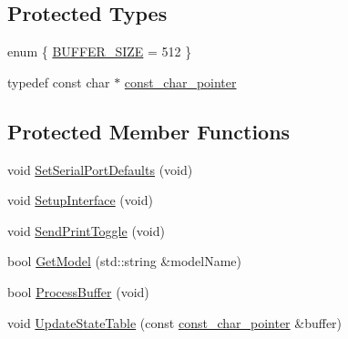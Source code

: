 \subsection*{Protected Types}
\begin{DoxyCompactItemize}
\item 
enum \{ \hyperlink{classmts_sartorius_serial_a3d845ebc5b0ea91a687044140a7b257aa7a2c0b5e39b999002353c52f30f82d1f}{B\-U\-F\-F\-E\-R\-\_\-\-S\-I\-Z\-E} = 512
 \}
\item 
typedef const char $\ast$ \hyperlink{classmts_sartorius_serial_a84eee50d0f43b06e6adac9ae20f4f02c}{const\-\_\-char\-\_\-pointer}
\end{DoxyCompactItemize}
\subsection*{Protected Member Functions}
\begin{DoxyCompactItemize}
\item 
void \hyperlink{classmts_sartorius_serial_a0acfac7c902913c73619a32f980b0825}{Set\-Serial\-Port\-Defaults} (void)
\item 
void \hyperlink{classmts_sartorius_serial_a9164bd6981785f181d85882d54c1a90b}{Setup\-Interface} (void)
\item 
void \hyperlink{classmts_sartorius_serial_ac2b2bb346c7a268c4520d08233eb514c}{Send\-Print\-Toggle} (void)
\item 
bool \hyperlink{classmts_sartorius_serial_a2538f5214752157e6753650f5a8f5160}{Get\-Model} (std\-::string \&model\-Name)
\item 
bool \hyperlink{classmts_sartorius_serial_a089d5aa3907c5da402baea5f0a8d5d45}{Process\-Buffer} (void)
\item 
void \hyperlink{classmts_sartorius_serial_a34e92243a311de737180ada96905ca40}{Update\-State\-Table} (const \hyperlink{classmts_sartorius_serial_a84eee50d0f43b06e6adac9ae20f4f02c}{const\-\_\-char\-\_\-pointer} \&buffer)
\end{DoxyCompactItemize}
